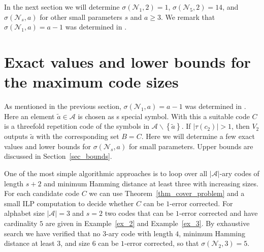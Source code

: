 \documentclass[11pt]{article}
\newcommand{\cA}{\mathcal{A}}
\newcommand{\cN}{\mathcal{N}}
\begin{document}
In the next section we will determine $\sigma(\cN_1,2)=1$, $\sigma(\cN_5,2)=14$, and $\sigma(\cN_s,a)$ for other small parameters $s$ and $a\ge 3$. We remark  
that $\sigma(\cN_1,a)=a-1$ was determined in \cite{beemer2022network,beemer2021curious}.

\section{Exact values and lower bounds for the maximum code sizes}
\label{sec_ilp}
As mentioned in the previous section, $\sigma(\cN_1,a)=a-1$ was determined in \cite{beemer2022network,beemer2021curious}. Here an element $\tilde{a}\in\cA$ is chosen as s special symbol.
With this a suitable code $C$ is a threefold repetition code of the symbols in $\cA\backslash\left\{\tilde{a}\right\}$. If $|\tau(c_2)|>1$, then $V_2$ outputs $\tilde{a}$ with the 
corresponding set $B=C$. Here we will determine a few exact values and lower bounds for $\sigma(\cN_s,a)$ for small parameters. Upper bounds are discussed in Section~\ref{sec_bounds}. 

One of the most simple algorithmic approaches is to loop over all $|\cA|$-ary codes of length $s+2$ and minimum Hamming distance at least three with increasing sizes. For each
candidate code $C$ we can use Theorem~\ref{thm_cover_problem} and a small ILP computation to decide whether $C$ can be $1$-error corrected. For alphabet size $|\cA|=3$ and $s=2$ two codes 
that can be $1$-error corrected and have cardinality $5$ are given in Example~\ref{ex_2} and Example~\ref{ex_3}.  
By exhaustive search we have verified that no $3$-ary code with length $4$, minimum Hamming distance at least $3$, and size $6$ can be $1$-error corrected, so that $\sigma(\cN_2,3)=5$.  
\end{document}
